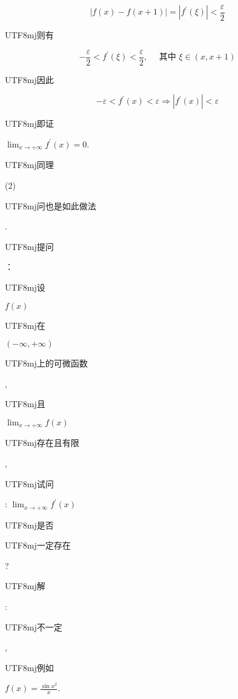 \documentclass[10pt]{article}
\begin{document}
$$
|f(x)-f(x+1)|=\left|f^{\prime}(\xi)\right|<\frac{\varepsilon}{2}
$$
\begin{CJK}{UTF8}{mj}则有\end{CJK}
$$
-\frac{\varepsilon}{2}<f^{\prime}(\xi)<\frac{\varepsilon}{2}, \quad \text { 其中 } \xi \in(x, x+1)
$$
\begin{CJK}{UTF8}{mj}因此\end{CJK}
$$
-\varepsilon<f^{\prime}(x)<\varepsilon \Rightarrow\left|f^{\prime}(x)\right|<\varepsilon
$$
\begin{CJK}{UTF8}{mj}即证\end{CJK} $\lim _{x \rightarrow+\infty} f^{\prime}(x)=0$.

\begin{CJK}{UTF8}{mj}同理\end{CJK} (2) \begin{CJK}{UTF8}{mj}问也是如此做法\end{CJK}.

\begin{CJK}{UTF8}{mj}提问\end{CJK}：\begin{CJK}{UTF8}{mj}设\end{CJK} $f(x)$ \begin{CJK}{UTF8}{mj}在\end{CJK} $(-\infty,+\infty)$ \begin{CJK}{UTF8}{mj}上的可微函数\end{CJK}, \begin{CJK}{UTF8}{mj}且\end{CJK} $\lim _{x \rightarrow+\infty} f(x)$ \begin{CJK}{UTF8}{mj}存在且有限\end{CJK}, \begin{CJK}{UTF8}{mj}试问\end{CJK}: $\lim _{x \rightarrow+\infty} f^{\prime}(x)$ \begin{CJK}{UTF8}{mj}是否\end{CJK} \begin{CJK}{UTF8}{mj}一定存在\end{CJK}?

\begin{CJK}{UTF8}{mj}解\end{CJK}: \begin{CJK}{UTF8}{mj}不一定\end{CJK}, \begin{CJK}{UTF8}{mj}例如\end{CJK} $f(x)=\frac{\sin x^{2}}{x}$.
\end{document}
